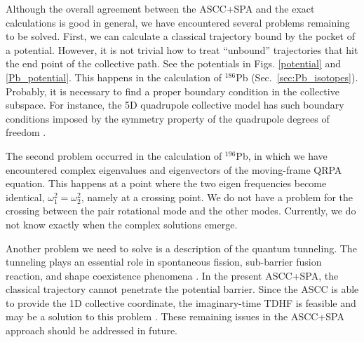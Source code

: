 \documentclass[%
superscriptaddress,
showpacs,
nofootinbib,
amsmath,amssymb,
aps,
prc,
twocolumn,
floatfix ]%
{revtex4-1}
\begin{document}
Although the overall agreement between the ASCC+SPA and the exact
calculations is good in general,
we have encountered several problems remaining to be solved.
First, we can calculate a classical trajectory bound by the
pocket of a potential. However, it is not trivial how to treat
``unbound'' trajectories that hit the end point of the collective path.
See the potentials in Figs. \ref{potential} and \ref{Pb_potential}.
This happens in the calculation of ${}^{186}$Pb
(Sec.~\ref{sec:Pb_isotopes}).
Probably, it is necessary to find a proper boundary condition
in the collective subspace.
For instance, the 5D quadrupole collective model has
such boundary conditions imposed by the symmetry property of
the quadrupole degrees of freedom \cite{KB67}.

The second problem occurred in the calculation of $^{196}$Pb,
in which we have encountered complex eigenvalues and eigenvectors
of the moving-frame QRPA equation.
This happens at a point where the two eigen frequencies become
identical, $\omega_1^2=\omega_2^2$, namely at a crossing point.
We do not have a problem for the crossing between the pair rotational
mode and the other modes.
Currently, we do not know exactly when the complex solutions emerge.

Another problem we need to solve is a description of the
quantum tunneling.
The tunneling plays an essential role in
spontaneous fission, sub-barrier fusion reaction, and
shape coexistence phenomena \cite{NMMY16,WN16,WN17,HNMM07,HNMM08}.
In the present ASCC+SPA, the classical trajectory
cannot penetrate the potential barrier.
Since the ASCC is able to provide the 1D collective coordinate,
the imaginary-time TDHF is feasible and may be a solution
to this problem \cite{Neg82}.
These remaining issues in the ASCC+SPA approach should be
addressed in future.

\end{document}
